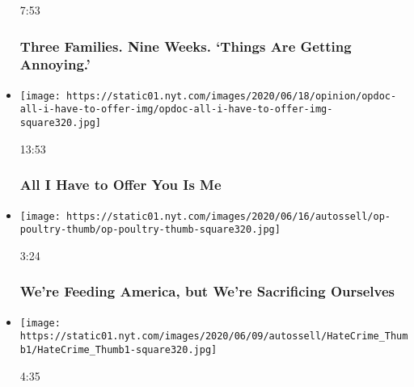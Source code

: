 \begin{itemize}
  7:53

  \hypertarget{three-families-nine-weeks-things-are-getting-annoying}{%
  \subsubsection{Three Families. Nine Weeks. `Things Are Getting
  Annoying.'}\label{three-families-nine-weeks-things-are-getting-annoying}}
\item
  \href{https://www.nytimes.com/video/opinion/100000007133685/all-i-have-to-offer-you-is-me.html?action=click\&module=video-series-bar\&region=header\&pgtype=Article\&playlistId=video/opinion}{}

  \texttt{[image: https://static01.nyt.com/images/2020/06/18/opinion/opdoc-all-i-have-to-offer-img/opdoc-all-i-have-to-offer-img-square320.jpg]}

  13:53

  \hypertarget{all-i-have-to-offer-you-is-me}{%
  \subsubsection{All I Have to Offer You Is
  Me}\label{all-i-have-to-offer-you-is-me}}
\item
  \href{https://www.nytimes.com/video/opinion/100000007184138/coronavirus-tyson-poultry.html?action=click\&module=video-series-bar\&region=header\&pgtype=Article\&playlistId=video/opinion}{}

  \texttt{[image: https://static01.nyt.com/images/2020/06/16/autossell/op-poultry-thumb/op-poultry-thumb-square320.jpg]}

  3:24

  \hypertarget{were-feeding-america-but-were-sacrificing-ourselves}{%
  \subsubsection{We're Feeding America, but We're Sacrificing
  Ourselves}\label{were-feeding-america-but-were-sacrificing-ourselves}}
\item
  \href{https://www.nytimes.com/video/opinion/100000007179746/hate-crime-bill-ahmaud-arbery.html?action=click\&module=video-series-bar\&region=header\&pgtype=Article\&playlistId=video/opinion}{}

  \texttt{[image: https://static01.nyt.com/images/2020/06/09/autossell/HateCrime\_Thumb1/HateCrime\_Thumb1-square320.jpg]}

  4:35

  \hypertarget{how-was-my-son-ahmaud-arberys-murder-not-a-hate-crime}{%
}
\end{itemize}
